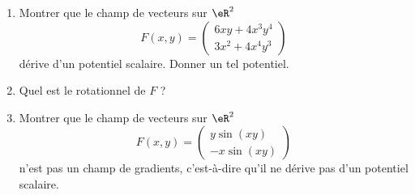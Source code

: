 
\begin{exercice}\label{exoOutilsMath-0097}

    \begin{enumerate}
        \item
            Montrer que le champ de vecteurs sur $\eR^2$
            \begin{equation}
                F(x,y)=\begin{pmatrix}
                    6xy+4x^3y^4    \\ 
                    3x^2+4x^4y^3    
                \end{pmatrix}
            \end{equation}
            dérive d'un potentiel scalaire. Donner un tel potentiel.
        \item
            Quel est le rotationnel de $F$ ?
        \item
            Montrer que le champ de vecteurs sur $\eR^2$
            \begin{equation}
                F(x,y)=\begin{pmatrix}
                    y\sin(xy)    \\ 
                    -x\sin(xy)    
                \end{pmatrix}
            \end{equation}
            n'est pas un champ de gradients, c'est-à-dire qu'il ne dérive pas d'un potentiel scalaire.
    \end{enumerate}

\end{exercice}

